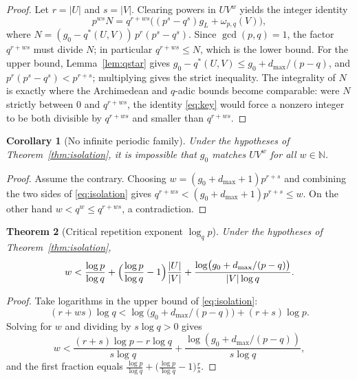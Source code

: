 \documentclass[11pt,a4paper]{article}
\newtheorem{theorem}{Theorem}[section]
\newtheorem{corollary}[theorem]{Corollary}
\theoremstyle{remark}
\newcommand{\N}{\mathbb{N}}
\begin{document}
\begin{proof}
Let $r = |U|$ and $s = |V|$. Clearing powers in $U V^{w}$ yields the integer identity
\begin{equation}
  p^{ws} N = q^{r + ws} \bigl((p^{s} - q^{s}) g_{L} + \omega_{p,q}(V)\bigr),
  \label{eq:key}
\end{equation}
where $N = (g_{0} - q^{*}(U,V))\, p^{r} (p^{s} - q^{s})$. Since $\gcd(p,q) = 1$, the factor $q^{r+ws}$ must divide $N$; in particular $q^{r+ws} \le N$, which is the lower bound. For the upper bound, Lemma~\ref{lem:qstar} gives $g_{0} - q^{*}(U,V) \le g_{0} + d_{\max}/(p-q)$, and $p^{r}(p^{s} - q^{s}) < p^{r+s}$; multiplying gives the strict inequality. The integrality of $N$ is exactly where the Archimedean and $q$-adic bounds become comparable: were $N$ strictly between $0$ and $q^{r+ws}$, the identity \eqref{eq:key} would force a nonzero integer to be both divisible by $q^{r+ws}$ and smaller than $q^{r+ws}$.
\end{proof}

\begin{corollary}[No infinite periodic family]
\label{cor:noinf}
Under the hypotheses of Theorem~\ref{thm:isolation}, it is impossible that $g_{0}$ matches $U V^{w}$ for all $w \in \N$.
\end{corollary}

\begin{proof}
Assume the contrary. Choosing $w = (g_{0} + d_{\max} + 1) p^{r+s}$ and combining the two sides of \eqref{eq:isolation} gives $q^{r+ws} < (g_{0} + d_{\max} + 1) p^{r+s} \le w$. On the other hand $w < q^{w} \le q^{r+ws}$, a contradiction.
\end{proof}

\begin{theorem}[Critical repetition exponent $\log_{q} p$]
\label{thm:pqrep}
Under the hypotheses of Theorem~\ref{thm:isolation},
\[
  w < \frac{\log p}{\log q} + \Bigl(\frac{\log p}{\log q} - 1\Bigr)\frac{|U|}{|V|}
      + \frac{\log\bigl(g_{0} + d_{\max}/(p-q)\bigr)}{|V| \log q}.
\]
\end{theorem}

\begin{proof}
Take logarithms in the upper bound of \eqref{eq:isolation}:
\[
  (r + ws) \log q < \log\bigl(g_{0} + d_{\max}/(p-q)\bigr) + (r+s)\log p .
\]
Solving for $w$ and dividing by $s \log q > 0$ gives
\[
  w < \frac{(r+s)\log p - r \log q}{s \log q} + \frac{\log(g_{0} + d_{\max}/(p-q))}{s \log q},
\]
and the first fraction equals $\tfrac{\log p}{\log q} + \bigl(\tfrac{\log p}{\log q} - 1\bigr)\tfrac{r}{s}$.
\end{proof}
\end{document}
